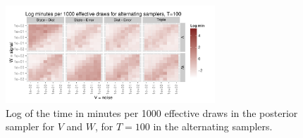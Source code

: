 \documentclass{article}
\begin{document}
\begin{figure}[!ht]
\centering
\includegraphics[width=0.7\textwidth]{altinttimeplot1}
\caption{Log of the time in minutes per 1000 effective draws in the posterior sampler for $V$ and $W$, for $T=100$ in the alternating samplers.}
\label{altinttimeplot}
\end{figure}


\clearpage

\end{document}
